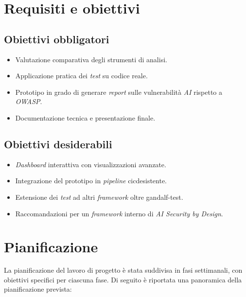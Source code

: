 \section{Requisiti e obiettivi}


\subsection{Obiettivi obbligatori}
\begin{itemize}
\item Valutazione comparativa degli strumenti di analisi.
\item Applicazione pratica dei \emph{test} su codice reale.
\item Prototipo in grado di generare \emph{report} sulle vulnerabilità \emph{AI} rispetto a \emph{OWASP}.
\item Documentazione tecnica e presentazione finale.
\end{itemize}

\subsection{Obiettivi desiderabili}
\begin{itemize}
\item \emph{Dashboard} interattiva con visualizzazioni avanzate.
\item Integrazione del prototipo in \emph{pipeline} \gls{cicd}\glsfirstoccur esistente.
\item Estensione dei \emph{test} ad altri \emph{framework} oltre \gls{gandalf-test}\glsfirstoccur.
\item Raccomandazioni per un \emph{framework} interno di \emph{AI Security by Design}.
\end{itemize}

\section{Pianificazione}

La pianificazione del lavoro di progetto è stata suddivisa in fasi settimanali, con obiettivi specifici per ciascuna fase. Di seguito è riportata una panoramica della pianificazione prevista:

